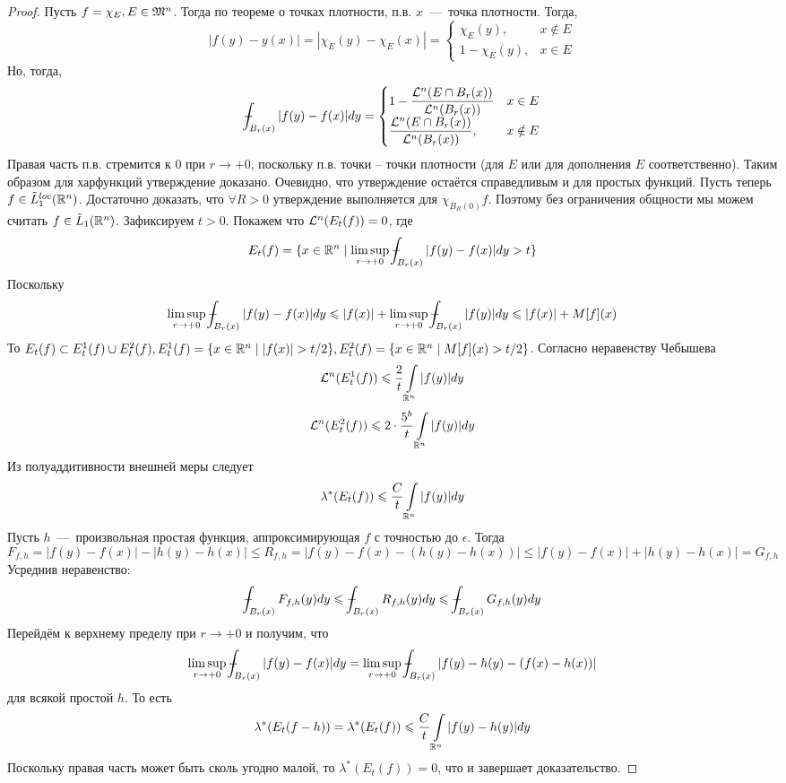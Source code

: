 \begin{proof}
    Пусть $f = \chi_E, E \in \mathfrak{M}^n$. Тогда по теореме о точках плотности, п.в. $x$~---~точка плотности. Тогда,
    \begin{equation*}
        |f(y) - y(x)| = |\chi_E(y) - \chi_E(x)| = \begin{cases}
            \chi_E(y), & x \notin E \\
            1 - \chi_E(y), & x \in E
        \end{cases}
    \end{equation*}
    Но, тогда, 
    \begin{equation*}
    \dashint_{B_r(x)}|f(y) - f(x)|dy = 
    \begin{cases}
        1 - \dfrac{\LL^n(E \cap B_r(x))}{\LL^n(B_r(x))} & x \in E \\
        \dfrac{\LL^n(E \cap B_r(x))}{\LL^n(B_r(x))}, & x \notin E
    \end{cases}
    \end{equation*}
    Правая часть п.в. стремится к 0 при $r \rightarrow +0$, поскольку п.в. точки -- точки плотности (для $E$ или для дополнения $E$ соответственно). Таким образом для харфункций утверждение доказано. Очевидно, что утверждение остаётся справедливым и для простых функций. Пусть теперь $f \in \Tilde{L}_1^{loc}(\mathbb{R}^n)$. Достаточно доказать, что $\forall R > 0$ утверждение выполняется для $\chi_{B_R(0)}f$. Поэтому без ограничения общности мы можем считать $f \in \Tilde{L}_1(\mathbb{R}^n)$. Зафиксируем $t > 0$. Покажем что $\mathcal{L}^n(E_t(f)) = 0$, где \[E_t(f) = \{x \in \R^n \mid \limsup\limits_{r \rightarrow +0} \dashint_{B_r(x)}|f(y) - f(x)|dy > t\}\]
    Поскольку \[\limsup\limits_{r \rightarrow +0} \dashint_{B_r(x)}|f(y) - f(x)|dy \leq |f(x)| + \limsup\limits_{r \rightarrow +0}\dashint_{B_r(x)}|f(y)|dy \leq |f(x)| + M[f](x)\]
    То $E_t(f) \subset E_t^1(f) \cup E_t^2(f), E_t^1(f) = \{x \in \mathbb{R}^n \mid |f(x)| > t/2\}, E_t^2(f) = \{x \in \mathbb{R}^n \mid M[f](x) > t/2\}$. Согласно неравенству Чебышева \[\mathcal{L}^n(E^1_t(f)) \leqslant \dfrac{2}{t}\int\limits_{\mathbb{R}^n} |f(y)|dy\]
    \[\mathcal{L}^n(E^2_t(f)) \leqslant 2 \cdot \dfrac{5^b}{t} \int\limits_{\mathbb{R}^n} |f(y)|dy\]
    Из полуаддитивности внешней меры следует \[\lambda^*(E_t(f)) \leqslant \dfrac{C}{t}\int\limits_{\mathbb{R}^n}|f(y)|dy\] 
    Пусть $h$~---~произвольная простая функция, аппроксимирующая $f$ с точностью до $\epsilon$. Тогда \[F_{f,h} = |f(y) - f(x)| - |h(y) - h(x)| \leq R_{f, h} = |f(y) - f(x) - (h(y) - h(x))| \leq |f(y) - f(x)| + |h(y) - h(x)| = G_{f, h}\]
    Усреднив неравенство: \[\dashint_{B_r(x)} F_{f, h}(y)dy \leq \dashint_{B_r(x)}R_{f, h}(y)dy \leq \dashint_{B_r(x)}G_{f, h}(y)dy\]
    Перейдём к верхнему пределу при $r \rightarrow +0$ и получим, что \[\limsup\limits_{r \rightarrow +0}\dashint_{B_r(x)}|f(y) - f(x)|dy = \limsup\limits_{r \rightarrow +0} \dashint_{B_r(x)} |f(y) - h(y) - (f(x) - h(x))|\]
    для всякой простой $h$. То есть \[\lambda^*(E_t(f - h)) = \lambda^*(E_t(f)) \leqslant \dfrac{C}{t}\int\limits_{\mathbb{R}^n}|f(y) - h(y)|dy\]
    Поскольку правая часть может быть сколь угодно малой, то $\lambda^*(E_t(f)) = 0$, что и завершает доказательство.
\end{proof}

